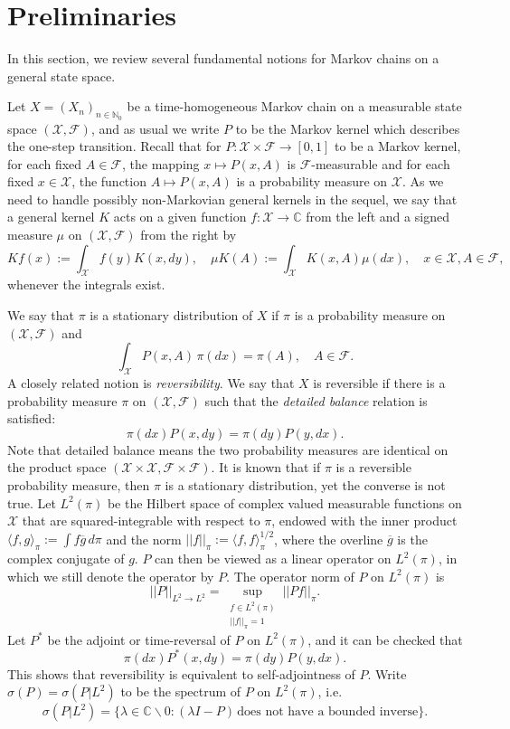 \documentclass[12pt,a4]{amsart}
\numberwithin{equation}{section}
\theoremstyle{plain}
\theoremstyle{definition}
\theoremstyle{remark}
\newcommand{\1}{\mathds{1}}
\begin{document}
\section{Preliminaries}\label{sec:prelim}
In this section, we review several fundamental notions for Markov chains on a general state space.

Let $X = (X_n)_{n \in \mathbb{N}_0}$ be a time-homogeneous Markov chain on a measurable state space $(\mathcal{X},\mathcal{F})$, and as usual we write $P$ to be the Markov kernel which describes the one-step transition. Recall that for $P : \mathcal{X} \times \mathcal{F} \to [0,1]$ to be a Markov kernel, for each fixed $A \in \mathcal{F}$, the mapping $x \mapsto P(x,A)$ is $\mathcal{F}$-measurable and for each fixed $x \in \mathcal{X}$, the function $A \mapsto P(x,A)$ is a probability measure on $\mathcal{X}$. As we need to handle possibly non-Markovian general kernels in the sequel, we say that a general kernel $K$ acts on a given function $f: \mathcal{X} \to \mathbb{C}$ from the left and a signed measure $\mu$ on $(\mathcal{X},\mathcal{F})$ from the right by
$$ Kf(x) := \int_{\mathcal{X}} f(y) K(x,dy), \quad \mu K(A) := \int_{\mathcal{X}} K(x,A) \mu(dx), \quad x \in \mathcal{X}, A \in \mathcal{F},$$
whenever the integrals exist. 

We say that $\pi$ is a stationary distribution of $X$  if $\pi$ is a probability measure on $(\mathcal{X},\mathcal{F})$ and
$$\int_{\mathcal{X}} P(x,A) \, \pi(dx) = \pi(A), \quad A \in \mathcal{F}.$$
A closely related notion is \textit{reversibility}. We say that $X$ is reversible if there is a probability measure $\pi$ on $(\mathcal{X},\mathcal{F})$ such that the \textit{detailed balance} relation is satisfied:
$$\pi(dx)P(x,dy) = \pi(dy) P(y,dx).$$
Note that detailed balance means the two probability measures are identical on the product space $(\mathcal{X} \times \mathcal{X},\mathcal{F} \times \mathcal{F})$. It is known that if $\pi$ is a reversible probability measure, then $\pi$ is a stationary distribution, yet the converse is not true. Let $L^2(\pi)$ be the Hilbert space of complex valued measurable functions on $\mathcal{X}$ that are squared-integrable with respect to $\pi$, endowed with the inner product $\langle f,g \rangle_{\pi} := \int f \overline{g} \, d\pi$ and the norm $||f||_{\pi} := \langle f,f \rangle_{\pi}^{1/2}$, where the overline $\overline{g}$ is the complex conjugate of $g$. $P$ can then be viewed as a linear operator on $L^2(\pi)$, in which we still denote the operator by $P$. The operator norm of $P$ on $L^2(\pi)$ is
$$||P||_{L^2 \to L^2} = \sup_{\substack{f \in L^2(\pi) \\ ||f||_{\pi}=1}} ||Pf||_{\pi}.$$
Let $P^*$ be the adjoint or time-reversal of $P$ on $L^2(\pi)$, and it can be checked that
$$\pi(dx)P^*(x,dy) = \pi(dy) P(y,dx).$$
This shows that reversibility is equivalent to self-adjointness of $P$. Write $\sigma(P) = \sigma(P|L^2)$ to be the spectrum of $P$ on $L^2(\pi)$, i.e.
$$\sigma(P|L^2) = \{\lambda \in \mathbb{C}\backslash 0 : (\lambda I - P) \, \text{does not have a bounded inverse} \}.$$
\end{document}
